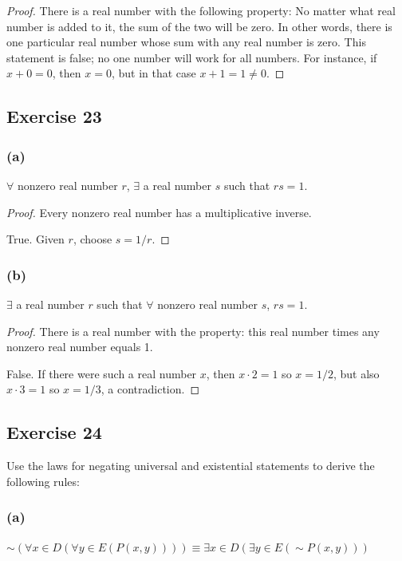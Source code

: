 \documentclass[14pt]{extarticle}
\newcommand{\fa}{\forall}
\newcommand{\te}{\exists}
\begin{document}
\begin{proof}
There is a real number with the following property: No matter what real number is added to it, the sum of the two will be zero. In other words, there is one particular real number whose sum with any real number is zero. This statement is false; no one number will work for all numbers. For instance, if $x + 0 = 0$, then $x = 0$, but in that case $x + 1 = 1 \neq 0$.
\end{proof}

\subsection{Exercise 23}
\subsubsection{(a)}
$\fa$ nonzero real number $r$, $\te$ a real number $s$ such that $rs = 1$.

\begin{proof}
Every nonzero real number has a multiplicative inverse. 

True. Given $r$, choose $s = 1/r$.
\end{proof}

\subsubsection{(b)}
$\te$ a real number $r$ such that $\fa$ nonzero real number $s$, $rs = 1$.

\begin{proof}
There is a real number with the property: this real number times any nonzero real number equals 1.

False. If there were such a real number $x$, then $x \cdot 2 = 1$ so $x = 1/2$, but also $x \cdot 3 = 1$ so $x = 1/3$, a contradiction.
\end{proof}

\subsection{Exercise 24}
Use the laws for negating universal and existential statements to derive the following rules:

\subsubsection{(a)}
$\sim(\fa x \in D(\fa y \in E(P(x, y)))) \equiv \te x \in D(\te y \in E({\sim P(x, y)}))$
\end{document}
